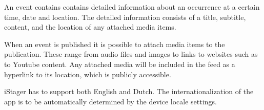 An event contains contains detailed information about an occurrence at a certain time, date and location. The detailed information consists of a title, subtitle, content, and the location of any attached media items. 

When an event is published it is possible to attach media items to the publication. These range from audio files and images to links to websites such as to Youtube content. Any attached media will be included in the feed as a hyperlink to its location, which is publicly accessible.

iStager has to support both English and Dutch. The internationalization of the app is to be automatically determined by the device locale settings. 



